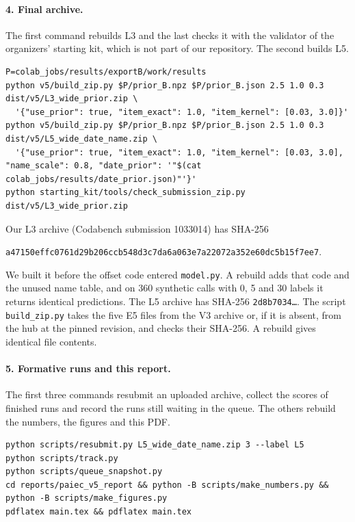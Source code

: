 \documentclass{article}
\begin{document}
\paragraph{4. Final archive.} The first command rebuilds L3 and the last checks it with the validator of the organizers' starting kit, which is not part of our repository. The second builds L5.
\begin{lstlisting}
P=colab_jobs/results/exportB/work/results
python v5/build_zip.py $P/prior_B.npz $P/prior_B.json 2.5 1.0 0.3 dist/v5/L3_wide_prior.zip \
  '{"use_prior": true, "item_exact": 1.0, "item_kernel": [0.03, 3.0]}'
python v5/build_zip.py $P/prior_B.npz $P/prior_B.json 2.5 1.0 0.3 dist/v5/L5_wide_date_name.zip \
  '{"use_prior": true, "item_exact": 1.0, "item_kernel": [0.03, 3.0], "name_scale": 0.8, "date_prior": '"$(cat colab_jobs/results/date_prior.json)"'}'
python starting_kit/tools/check_submission_zip.py dist/v5/L3_wide_prior.zip
\end{lstlisting}
Our L3 archive (Codabench submission 1033014) has SHA-256
\begin{center}\texttt{a47150effc0761d29b206ccb548d3c7da6a063e7a22072a352e60dc5b15f7ee7}.\end{center}
We built it before the offset code entered \texttt{model.py}. A rebuild adds that code and the unused name table, and on 360 synthetic calls with 0, 5 and 30 labels it returns identical predictions. The L5 archive has SHA-256 \texttt{2d8b7034\ldots}.
 The script \texttt{build\_zip.py} takes the five E5 files from the V3 archive or, if it is absent, from the hub at the pinned revision, and checks their SHA-256. A rebuild gives identical file contents.

\paragraph{5. Formative runs and this report.} The first three commands resubmit an uploaded archive, collect the scores of finished runs and record the runs still waiting in the queue. The others rebuild the numbers, the figures and this PDF.
\begin{lstlisting}
python scripts/resubmit.py L5_wide_date_name.zip 3 --label L5
python scripts/track.py
python scripts/queue_snapshot.py
cd reports/paiec_v5_report && python -B scripts/make_numbers.py && python -B scripts/make_figures.py
pdflatex main.tex && pdflatex main.tex
\end{lstlisting}
\end{document}
